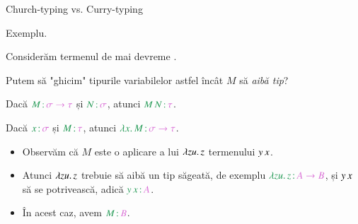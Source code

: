 \documentclass[xcolor=pdftex,romanian,colorlinks]{beamer}
\begin{document}
\begin{frame}{Church-typing vs. Curry-typing}

{\color{True} Exemplu.}

Considerăm termenul de mai devreme .

Putem să "ghicim" tipurile variabilelor astfel încât $M$ să \textit{aibă tip}?

 \hfill Dacă $\type{M}{\sigma \to \tau}$ și $\type{N}{\sigma}$,
\hfill atunci $\type{\app{M}{N}}{\tau}$.

 \hfill Dacă $\type{x}{\sigma}$ și $\type{M}{\tau}$,
\hfill atunci $\type{\abs{x}{M}}{\sigma \to \tau}$.

\pause\vspace{-.2cm}
\begin{itemize}
	\item Observăm că $M$ este o aplicare a lui {$\lambda zu.\,z$} termenului {$y\, x$}. 
	\item Atunci {$\lambda zu.\,z$} trebuie să aibă un tip săgeată, de exemplu {\color{True}$\type{\abs{zu}{z}}{A \to B}$}, și {$y\, x$} să se potrivească, adică {\color{True}$\type{\app{y}{x}}{A}$}. 
	\item În acest caz, avem {\color{True}$\type{M}{B}$}.
\end{itemize}
\end{frame}
\end{document}
